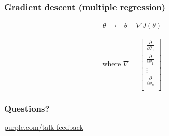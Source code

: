 \begin{frame}
  \frametitle{Gradient descent (multiple regression)}

  \begin{bphrase}
    \begin{align*}
      \theta & \leftarrow\, \theta - \nabla J(\theta)
    \end{align*}

    \begin{displaymath}
      \mbox{where } \nabla =
      \begin{bmatrix}
        \frac{\partial}{\partial\theta_0} \\[2mm]
        \frac{\partial}{\partial\theta_1} \\[2mm]
        \vdots\\[2mm]
        \frac{\partial}{\partial\theta_n} \\
      \end{bmatrix}
    \end{displaymath}
  \end{bphrase}
\end{frame}


\begin{frame}
  \frametitle{Questions?}
  \centerline{\large\url{purple.com/talk-feedback}}
\end{frame}


